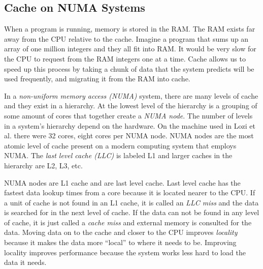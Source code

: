 \documentclass{sig-alternate}
\begin{document}


\subsection{Cache on NUMA Systems}
\label{sec:cache}

When a program is running, memory is stored in the RAM. The RAM exists far away from the CPU relative to the cache. Imagine a program that sums up an array of one million integers and they all fit into RAM. It would be very slow for the CPU to request from the RAM integers one at a time. Cache allows us to speed up this process by taking a chunk of data that the system predicts will be used frequently, and migrating it from the RAM into cache.

In a \emph{non-uniform memory access (NUMA)} system, there are many levels of cache and they exist in a hierarchy. At the lowest level of the hierarchy is a grouping of some amount of cores that together create a \emph{NUMA node}. The number of levels in a system's hierarchy depend on the hardware. On the machine used in Lozi et al. there were 32 cores, eight cores per NUMA node. NUMA nodes are the most atomic level of cache present on a modern computing system that employs NUMA. The \emph{last level cache (LLC)} is labeled L1 and larger caches in the hierarchy are L2, L3, etc.

NUMA nodes are L1 cache and are last level cache. Last level cache has the fastest data lookup times from a core because it is located nearer to the CPU. If a unit of cache is not found in an L1 cache, it is called an \emph{LLC miss} and the data is searched for in the next level of cache. If the data can not be found in any level of cache, it is just called a \emph{cache miss} and external memory is consulted for the data. Moving data on to the cache and closer to the CPU improves \emph{locality} because it makes the data more ``local'' to where it needs to be. Improving locality improves performance because the system works less hard to load the data it needs.~\cite{WikiCache}
\end{document}
